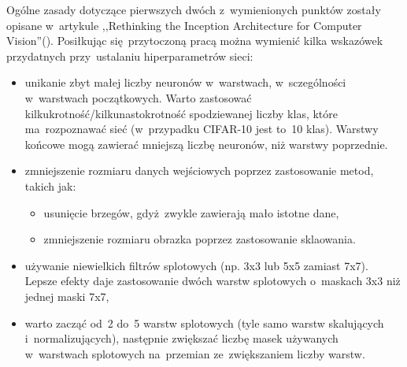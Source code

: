 Ogólne zasady dotyczące pierwszych dwóch z~wymienionych punktów zostały opisane w~artykule
,,Rethinking the Inception Architecture for Computer Vision''(\cite{RIACV}). Posiłkując się~przytoczoną pracą można
wymienić kilka wskazówek przydatnych przy~ustalaniu hiperparametrów sieci:
\begin{itemize}
    \item unikanie zbyt małej liczby neuronów w~warstwach, w~sczególności w~warstwach początkowych. Warto zastosować
          kilkukrotność/kilkunastokrotność spodziewanej liczby klas, które ma~rozpoznawać sieć
          (w~przypadku CIFAR-10 jest to~10 klas). Warstwy końcowe mogą zawierać mniejszą liczbę neuronów, niż warstwy
          poprzednie.
    \item zmniejszenie rozmiaru danych wejściowych poprzez zastosowanie metod, takich jak:
          \begin{itemize}
              \item usunięcie brzegów, gdyż~zwykle zawierają mało istotne dane,
              \item zmniejszenie rozmiaru obrazka poprzez zastosowanie sklaowania.
          \end{itemize}
    \item używanie niewielkich filtrów splotowych (np. 3x3 lub 5x5 zamiast 7x7). Lepsze efekty daje zastosowanie dwóch
          warstw splotowych o~maskach 3x3 niż jednej maski 7x7,
    \item warto zacząć od~2 do~5 warstw splotowych (tyle samo warstw skalujących i~normalizujących), następnie zwiększać
          liczbę masek używanych w~warstwach splotowych na~przemian ze~zwiększaniem liczby warstw.
\end{itemize}

